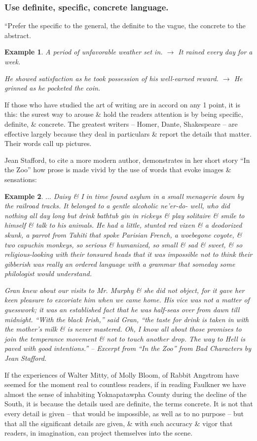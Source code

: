 \documentclass{article}
\newtheorem{example}{Example}
\begin{document}
\subsubsection{Use definite, specific, concrete  language.}
``Prefer the specific to the general, the definite to the vague, the concrete to the abstract.
\begin{example}
	A period of unfavorable weather set in. $\to$ It rained every day for a week.
	
	He showed satisfaction as he took possession of his well-earned reward. $\to$ He grinned as he pocketed the coin.
\end{example}
If those who have studied the art of writing are in accord on any 1 point, it is this: the surest way to arouse \& hold the readers attention is by being specific, definite, \& concrete. The greatest writers -- Homer, Dante, Shakespeare -- are effective largely because they deal in particulars \& report the details that matter. Their words call up pictures.

Jean Stafford, to cite a more modern author, demonstrates in her short story ``In the Zoo'' how prose is made vivid by the use of words that evoke images \& sensations:
\begin{example}
	$\ldots$ Daisy \& I in time found asylum in a small menagerie down by the railroad tracks. It belonged to a gentle alcoholic ne'er-do- well, who did nothing all day long but drink bathtub gin in rickeys \&  play solitaire \&  smile to himself \&  talk to his animals. He had a little, stunted red vixen \&  a deodorized skunk, a parrot from Tahiti that spoke Parisian French, a woebegone coyote, \&  two capuchin monkeys, so serious \&  humanized, so small \&  sad \&  sweet, \&  so religious-looking with their tonsured heads that it was impossible not to think their gibberish was really an ordered language with a grammar that someday some philologist would understand.
	
	Gran knew about our visits to Mr. Murphy \&  she did not object, for it gave her keen pleasure to excoriate him when we came home. His vice was not a matter of guesswork; it was an established fact that he was half-seas over from dawn till midnight. ``With the black Irish,'' said Gran, ``the taste for drink is taken in with the mother's milk \&  is never mastered. Oh, I know all about those promises to join the temperance movement \&  not to touch another drop. The way to Hell is paved with good intentions.'' -- Excerpt from ``In the Zoo'' from Bad Characters by Jean Stafford.
\end{example}
If the experiences of Walter Mitty, of Molly Bloom, of Rabbit Angstrom have seemed for the moment real to countless readers, if in reading Faulkner we have almost the sense of inhabiting Yoknapatawpha County during the decline of the South, it is because the details used are definite, the terms concrete. It is not that every detail is given -- that would be impossible, as well as to no purpose -- but that all the significant details are given, \&  with such accuracy \&  vigor that readers, in imagination, can project themselves into the scene.
\end{document}
